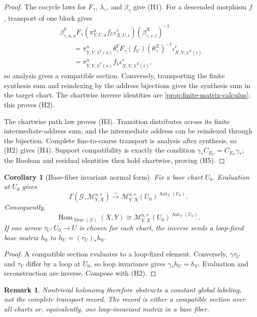 \documentclass[11pt]{article}
\newtheorem{corollary}[theorem]{Corollary}
\newtheorem{remark}[theorem]{Remark}
\newcommand{\HomC}{\operatorname{Hom}}
\newcommand{\Aut}{\operatorname{Aut}}
\newcommand{\Desc}{\operatorname{Desc}}
\begin{document}
\begin{proof}
The cocycle laws for \(F_\gamma\), \(\lambda_\gamma\), and \(\beta_\gamma\) give (H1).  For a descended morphism \(f\), transport of one block gives
\[
\begin{aligned}
 &\beta^Y_{\gamma,u,a}F_\gamma
 (\pi^u_{Y,U,a}f_U\iota^r_{X,U,i})
 (\beta^X_{\gamma,r,i})^{-1}\\
 &\qquad=
 \pi^u_{Y,V,\lambda^Y(a)}
 \theta^Y_\gamma F_\gamma(f_U)(\theta^X_\gamma)^{-1}
 \iota^r_{X,V,\lambda^X(i)}\\
 &\qquad=
 \pi^u_{Y,V,\lambda^Y(a)}f_V
 \iota^r_{X,V,\lambda^X(i)},
\end{aligned}
\]
so analysis gives a compatible section.  Conversely, transporting the finite synthesis sum and reindexing by the address bijections gives the synthesis sum in the target chart.  The chartwise inverse identities are \cref{prop:finite-matrix-calculus}; this proves (H2).

The chartwise path law proves (H3).  Transition distributes across its finite intermediate-address sum, and the intermediate address can be reindexed through the bijection.  Complete fine-to-coarse transport is analysis after synthesis, so (H2) gives (H4).  Support compatibility is exactly the condition \(\gamma_*C_{E_U}=C_{E_V}\gamma_*\); the Boolean and residual identities then hold chartwise, proving (H5).
\end{proof}

\begin{corollary}[Base-fiber invariant normal form]
\label{cor:base-fiber}
Fix a base chart \(U_0\).  Evaluation at \(U_0\) gives
\[
 \Gamma(\mathscr G,\mathscr M^{u,r}_{Y,X})
 \xrightarrow{\sim}
 \mathscr M^{u,r}_{Y,X}(U_0)^{\Aut_{\mathscr G}(U_0)}.
\]
Consequently,
\[
 \boxed{
 \HomC_{\Desc(\mathscr G)}(X,Y)
 \cong
 \mathscr M^{u,r}_{Y,X}(U_0)^{\Aut_{\mathscr G}(U_0)}.}
\]
If one arrow \(\tau_U:U_0\to U\) is chosen for each chart, the inverse sends a loop-fixed base matrix \(h_0\) to \(h_U=(\tau_U)_*h_0\).
\end{corollary}

\begin{proof}
A compatible section evaluates to a loop-fixed element.  Conversely, \(\gamma\tau_U\) and \(\tau_V\) differ by a loop at \(U_0\), so loop invariance gives \(\gamma_*h_U=h_V\).  Evaluation and reconstruction are inverse.  Compose with (H2).
\end{proof}

\begin{remark}
Nontrivial holonomy therefore obstructs a constant global labeling, not the complete transport record.  The record is either a compatible section over all charts or, equivalently, one loop-invariant matrix in a base fiber.
\end{remark}
\end{document}
